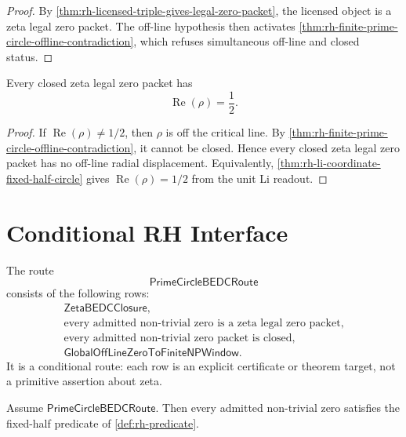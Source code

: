 \begin{proof}
By
\autoref{thm:rh-licensed-triple-gives-legal-zero-packet}, the licensed
object is a zeta legal zero packet.  The off-line hypothesis then
activates
\autoref{thm:rh-finite-prime-circle-offline-contradiction}, which
refuses simultaneous off-line and closed status.
\end{proof}

\begin{corollary}
\label{cor:rh-legal-closed-zeta-zeros-fixed-half-readout}
Every closed zeta legal zero packet has
$$
\operatorname{Re}(\rho)=\frac12.
$$
\end{corollary}

\begin{proof}
If $\operatorname{Re}(\rho)\ne1/2$, then $\rho$ is off the critical line.
By
\autoref{thm:rh-finite-prime-circle-offline-contradiction}, it cannot be
closed.  Hence every closed zeta legal zero packet has no off-line
radial displacement.  Equivalently,
\autoref{thm:rh-li-coordinate-fixed-half-circle} gives
$\operatorname{Re}(\rho)=1/2$ from the unit Li readout.
\end{proof}

\section{Conditional RH Interface}
\label{sec:rh-prime-circle-conditional-rh-interface}

\begin{definition}[PrimeCircleBEDCRoute]
\label{def:rh-prime-circle-bedc-route}
The route
$$
\mathsf{PrimeCircleBEDCRoute}
$$
consists of the following rows:
$$
\begin{gathered}
\mathsf{ZetaBEDCClosure},\\
\text{every admitted non-trivial zero is a zeta legal zero packet},\\
\text{every admitted non-trivial zero packet is closed},\\
\mathsf{GlobalOffLineZeroToFiniteNPWindow}.
\end{gathered}
$$
It is a conditional route: each row is an explicit certificate or
theorem target, not a primitive assertion about zeta.
\end{definition}

\begin{theorem}
\label{thm:rh-prime-circle-bedc-route-gives-rh-predicate}
Assume $\mathsf{PrimeCircleBEDCRoute}$.  Then every admitted
non-trivial zero satisfies the fixed-half predicate of
\autoref{def:rh-predicate}.
\end{theorem}

